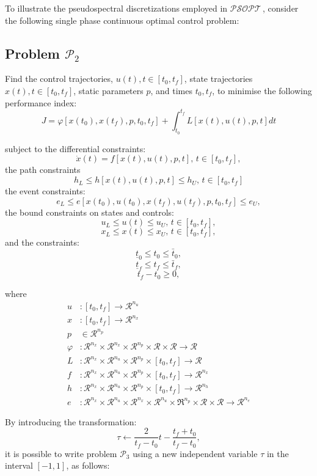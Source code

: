 \documentclass[a4paper,11pt]{report}    %
\newcommand{\psopt}{$\mathcal{PSOPT}$\,}  %
\newcommand{\RE}{\mathcal{R}}
\begin{document}
To illustrate the pseudospectral discretizations employed in \psopt, consider the following single phase continuous optimal control problem:


\subsection*{Problem $\mathcal{P}_2$} Find the control trajectories, $u(t), t\in [t_0, t_f]$, state trajectories $x(t), t\in [t_0, t_f]$,  static parameters $p$, and 
times $t_0, t_f$, to minimise the following performance index:
\[
   J =  \varphi[ x(t_0), x(t_f), p, t_0, t_f ] + \int_{t_0}^{t_f} L[x(t),u(t),p, t] dt 
\]

\noindent subject to the differential constraints:
\[
 \dot x(t) = f[ x(t),u(t), p, t ],  \,t\in[t_0,t_f],
\]
the path constraints
\[
 h_L \le h[ x(t),u(t), p, t ] \le h_U,  \,t\in[t_0,t_f]
\]
the event constraints:
\[
 e_L \le e[ x(t_0),u(t_0),x(t_f),u(t_f), p, t_0, t_f ] \le e_U, 
\]
the bound constraints on states and controls:
\[
    u_L \le u(t) \le u_U, \, t\in[t_0,t_f], 
\]
\[
    x_L \le x(t) \le x_U, \, t\in[t_0,t_f], 
\]
and the constraints:
\[
    \underline{t}_0 \le t_0 \le \bar{t}_0, 
\]
\[
    \underline{t}_f \le t_f \le \bar{t}_f, 
\]
\[
    t_f - t_0 \ge 0, 
\]

\noindent where
\begin{equation}
\begin{aligned}
  u&: [t_0, t_f] \rightarrow \RE^{n_u} \\
  x&: [t_0, t_f] \rightarrow \RE^{n_x} \\
  p &\in \RE^{n_p} \\
  \varphi&: \RE^{n_x} \times \RE^{n_x} \times \RE^{n_p} \times \RE \times \RE \rightarrow \RE \\
  L&: \RE^{n_x} \times \RE^{n_u} \times \RE^{n_p} \times [t_0,t_f] \rightarrow \RE  \\
  f&: \RE^{n_x} \times \RE^{n_u} \times \RE^{n_p} \times [t_0,t_f] \rightarrow \RE^{n_x}  \\
  h&: \RE^{n_x} \times \RE^{n_u} \times \RE^{n_p} \times [t_0,t_f] \rightarrow \RE^{n_h}  \\
  e&: \RE^{n_x} \times \RE^{n_u} \times \RE^{n_x} \times \RE^{n_u} \times \Re^{n_p} \times \RE \times \RE  \rightarrow \RE^{n_e}  
\end{aligned}
\end{equation}



By introducing the transformation:
\[
  \tau \leftarrow \frac{2}{t_f-t_0} t - \frac{t_f+t_0}{t_f-t_0},
\]
it is possible to write problem $\mathcal{P}_3$ using a new independent variable  $\tau$ in the interval $[-1,1]$, as follows:
\end{document}
